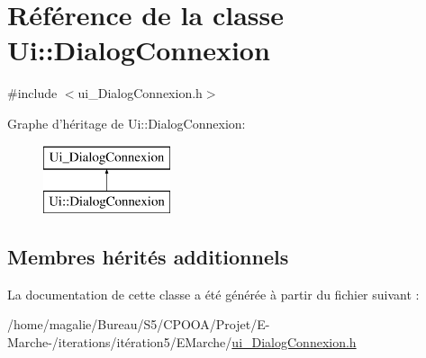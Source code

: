 \hypertarget{class_ui_1_1_dialog_connexion}{\section{Référence de la classe Ui\-:\-:Dialog\-Connexion}
\label{class_ui_1_1_dialog_connexion}
}


{\ttfamily \#include $<$ui\-\_\-\-Dialog\-Connexion.\-h$>$}

Graphe d'héritage de Ui\-:\-:Dialog\-Connexion\-:\begin{figure}[H]
\begin{center}
\leavevmode
\includegraphics[height=2.000000cm]{class_ui_1_1_dialog_connexion}
\end{center}
\end{figure}
\subsection*{Membres hérités additionnels}


La documentation de cette classe a été générée à partir du fichier suivant \-:\begin{DoxyCompactItemize}
\item 
/home/magalie/\-Bureau/\-S5/\-C\-P\-O\-O\-A/\-Projet/\-E-\/\-Marche-\//iterations/itération5/\-E\-Marche/\hyperlink{ui___dialog_connexion_8h}{ui\-\_\-\-Dialog\-Connexion.\-h}\end{DoxyCompactItemize}
